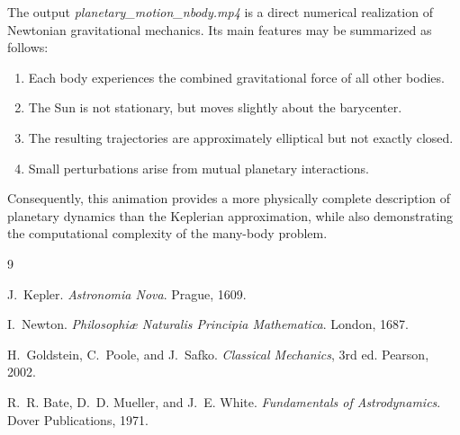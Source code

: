 \documentclass[12pt]{article}
\begin{document}
The output \textit{planetary\_motion\_nbody.mp4} is a direct numerical realization
of Newtonian gravitational mechanics. Its main features may be summarized as follows:

\begin{enumerate}[label=\arabic*.]
    \item Each body experiences the combined gravitational force of all other bodies.
    \item The Sun is not stationary, but moves slightly about the barycenter.
    \item The resulting trajectories are approximately elliptical but not exactly closed.
    \item Small perturbations arise from mutual planetary interactions.
\end{enumerate}

Consequently, this animation provides a more physically complete description of
planetary dynamics than the Keplerian approximation, while also demonstrating the
computational complexity of the many-body problem.

\begin{thebibliography}{9}

J.~Kepler.
\newblock \textit{Astronomia Nova}.
\newblock Prague, 1609.

I.~Newton.
\newblock \textit{Philosophi\ae{} Naturalis Principia Mathematica}.
\newblock London, 1687.

H.~Goldstein, C.~Poole, and J.~Safko.
\newblock \textit{Classical Mechanics}, 3rd ed.
\newblock Pearson, 2002.

R.~R. Bate, D.~D. Mueller, and J.~E. White.
\newblock \textit{Fundamentals of Astrodynamics}.
\newblock Dover Publications, 1971.

\end{thebibliography}
\end{document}
